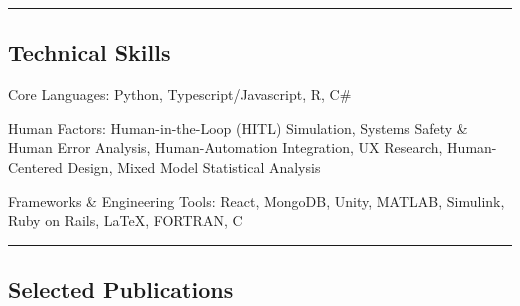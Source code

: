 \documentclass[10pt,letterpaper]{article}
\newenvironment{indentsection}[1]%
{\begin{list}{}%
	{\setlength{\leftmargin}{#1}}%
	\item[]%
}
{\end{list}}
\newcommand{\CPP}
{C\nolinebreak[4]\hspace{-.05em}\raisebox{.22ex}{\footnotesize\bf ++}}
\begin{document}
\hrule
\vspace{-0.5em}
\subsection*{Technical Skills}

\begin{indentsection}{\parindent}
	\begin{description*}
		\item[Core Languages:] Python, Typescript/Javascript, R, C\# 
		\item[Human Factors:] Human-in-the-Loop (HITL) Simulation, Systems Safety \& Human Error Analysis, Human-Automation Integration, UX Research, Human-Centered Design, Mixed Model Statistical Analysis
		\item[Frameworks \& Engineering Tools:] React, MongoDB, Unity, MATLAB, Simulink, Ruby on Rails, \LaTeX, FORTRAN, \CPP
	\end{description*}
\end{indentsection}

\hrule
\vspace{-0.5em}
\subsection*{Selected Publications}

\nocite{*}
\renewcommand{\section}[2]{}%

\end{document}
